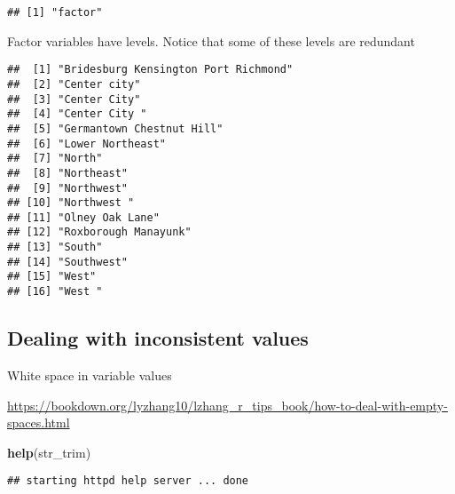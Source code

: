 \documentclass[]{article}
\newenvironment{Shaded}{\begin{snugshade}}{\end{snugshade}}
\newcommand{\KeywordTok}[1]{\textcolor[rgb]{0.13,0.29,0.53}{\textbf{#1}}}
\newcommand{\DataTypeTok}[1]{\textcolor[rgb]{0.13,0.29,0.53}{#1}}
\newcommand{\StringTok}[1]{\textcolor[rgb]{0.31,0.60,0.02}{#1}}
\newcommand{\CommentTok}[1]{\textcolor[rgb]{0.56,0.35,0.01}{\textit{#1}}}
\newcommand{\OperatorTok}[1]{\textcolor[rgb]{0.81,0.36,0.00}{\textbf{#1}}}
\newcommand{\NormalTok}[1]{#1}
\begin{document}
\begin{verbatim}
## [1] "factor"
\end{verbatim}

Factor variables have levels. Notice that some of these levels are
redundant

\begin{Shaded}
\end{Shaded}

\begin{verbatim}
##  [1] "Bridesburg Kensington Port Richmond"
##  [2] "Center city"                        
##  [3] "Center City"                        
##  [4] "Center City "                       
##  [5] "Germantown Chestnut Hill"           
##  [6] "Lower Northeast"                    
##  [7] "North"                              
##  [8] "Northeast"                          
##  [9] "Northwest"                          
## [10] "Northwest "                         
## [11] "Olney Oak Lane"                     
## [12] "Roxborough Manayunk"                
## [13] "South"                              
## [14] "Southwest"                          
## [15] "West"                               
## [16] "West "
\end{verbatim}

\subsection{Dealing with inconsistent
values}\label{dealing-with-inconsistent-values}

White space in variable values

\url{https://bookdown.org/lyzhang10/lzhang_r_tips_book/how-to-deal-with-empty-spaces.html}

\begin{Shaded}
\begin{Highlighting}[]
\KeywordTok{help}\NormalTok{(str_trim)}
\end{Highlighting}
\end{Shaded}

\begin{verbatim}
## starting httpd help server ... done
\end{verbatim}

\begin{Shaded}
\end{Shaded}
\end{document}
